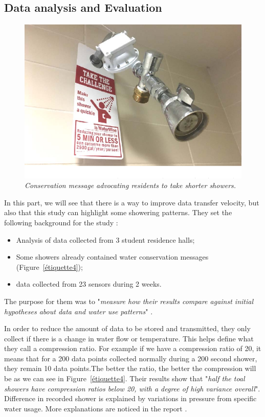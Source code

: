 \documentclass[10pt,journal,compsoc]{IEEEtran}
\begin{document}
\subsection{Data analysis and Evaluation}
\begin{center}
    \begin{figure}[!t]
        \includegraphics[scale=0.4]{water-message.png}
        \caption{\label{étiquette3} \emph{ Conservation message advocating residents to take shorter showers.} \cite{IEEEhowto:}}
    \end{figure}

\end{center}
In this part, we will see that there is a way to improve data transfer velocity, but also that this study can highlight some showering patterns. They set the following background for the study : 
\begin{itemize}
    \item Analysis of data collected from 3 student residence halls;
    \item Some showers already contained water conservation messages (Figure~\ref{étiquette4});
    \item data collected from 23 sensors during 2 weeks.
\end{itemize}
The purpose for them was to "\emph{measure how their results compare against initial hypotheses about data and water use patterns}" \cite{IEEEhowto:}.

In order to reduce the amount of data to be stored and transmitted, they only collect if there is a change in water flow or temperature. This helps define what they call a compression ratio. For example if we have a compression ratio of 20, it means that for a 200 data points collected normally during a 200 second shower, they remain 10 data points.The better the ratio, the better the compression will be as we can see in Figure~\ref{étiquette4}. Their results show that "\emph{half the toal showers have compression ratios below 20, with a degree of high variance overall}"\cite{IEEEhowto:}. Difference in recorded shower is explained by variations in pressure from specific water usage. More explanations are noticed in the report \cite{IEEEhowto:}.
\end{document}
